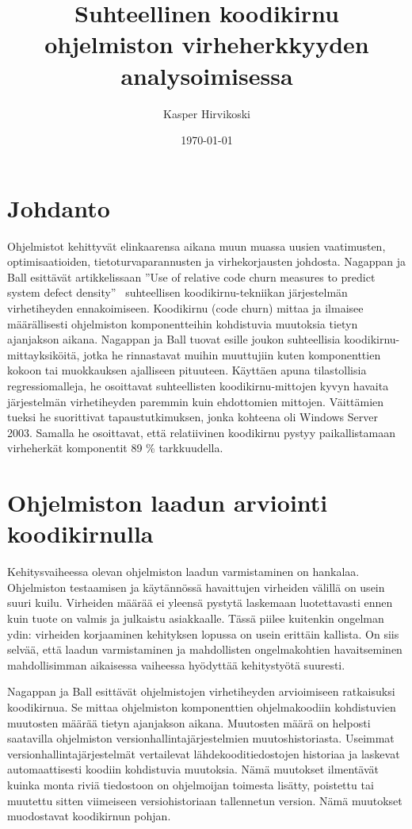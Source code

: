 \documentclass[finnish]{../tktltiki2}
\title{Suhteellinen koodikirnu ohjelmiston virheherkkyyden\\analysoimisessa}
\author{Kasper Hirvikoski}
\date{\today}
\theoremstyle{definition}
\theoremstyle{remark}
\begin{document}

\maketitle

\tableofcontents
\newpage


\section{Johdanto}

Ohjelmistot kehittyvät elinkaarensa aikana muun muassa uusien vaatimusten, optimisaatioiden, tietoturvaparannusten ja 
virhekorjausten johdosta. Nagappan ja Ball esittävät artikkelissaan ''Use of relative code churn measures to predict 
system defect density''~\cite{NB05} suhteellisen koodikirnu-tekniikan järjestelmän virhetiheyden ennakoimiseen. 
Koodikirnu (code churn) mittaa ja ilmaisee määrällisesti ohjelmiston komponentteihin kohdistuvia muutoksia tietyn 
ajanjakson aikana. Nagappan ja Ball tuovat esille joukon suhteellisia koodikirnu-mittayksiköitä, jotka he rinnastavat 
muihin muuttujiin kuten komponenttien kokoon tai muokkauksen ajalliseen pituuteen. Käyttäen apuna tilastollisia 
regressiomalleja, he osoittavat suhteellisten koodikirnu-mittojen kyvyn havaita järjestelmän virhetiheyden paremmin 
kuin ehdottomien mittojen. Väittämien tueksi he suorittivat tapaustutkimuksen, jonka kohteena oli Windows Server 2003. 
Samalla he osoittavat, että relatiivinen koodikirnu pystyy paikallistamaan virheherkät komponentit 89 \% tarkkuudella.

\section{Ohjelmiston laadun arviointi koodikirnulla}

Kehitysvaiheessa olevan ohjelmiston laadun varmistaminen on hankalaa. Ohjelmiston testaamisen ja käytännössä havaittujen 
virheiden välillä on usein suuri kuilu. Virheiden määrää ei yleensä pystytä laskemaan luotettavasti ennen kuin tuote on 
valmis ja julkaistu asiakkaalle. Tässä piilee kuitenkin ongelman ydin: virheiden korjaaminen kehityksen lopussa on usein 
erittäin kallista. On siis selvää, että laadun varmistaminen ja mahdollisten ongelmakohtien havaitseminen mahdollisimman 
aikaisessa vaiheessa hyödyttää kehitystyötä suuresti.

    Nagappan ja Ball esittävät ohjelmistojen virhetiheyden arvioimiseen ratkaisuksi koodikirnua. Se mittaa ohjelmiston 
komponenttien ohjelmakoodiin kohdistuvien muutosten määrää tietyn ajanjakson aikana. Muutosten määrä on helposti 
saatavilla ohjelmiston versionhallintajärjestelmien muutoshistoriasta. Useimmat versionhallintajärjestelmät vertailevat 
lähdekooditiedostojen historiaa ja laskevat automaattisesti koodiin kohdistuvia muutoksia. Nämä muutokset ilmentävät 
kuinka monta riviä tiedostoon on ohjelmoijan toimesta lisätty, poistettu tai muutettu sitten viimeiseen versiohistoriaan 
tallennetun version. Nämä muutokset muodostavat koodikirnun pohjan.
\end{document}
